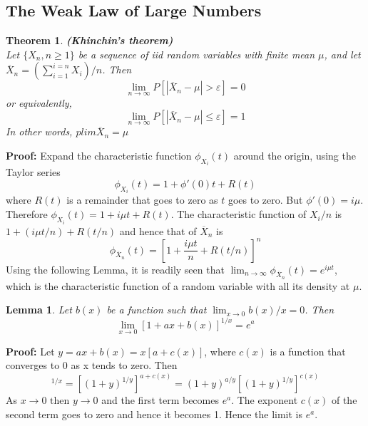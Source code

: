 \documentclass{article}
\newtheorem{theorem}{Theorem}[section]
\newtheorem{lemma}{Lemma}[section]
\begin{document}
\subsection{The Weak Law of Large Numbers}

\begin{theorem}
    \textbf{(Khinchin's theorem)}\\
    Let \(\{X_n, n\geq 1\}\) be a sequence of iid random variables with finite mean \(\mu\), and let \(\overline{X}_n=(\sum_{i=1}^{i=n}X_i)/n\). Then
    \begin{equation*}
        \lim_{n\rightarrow \infty} P[|\overline{X}_n-\mu|>\varepsilon]=0
    \end{equation*}
    or equivalently,
    \begin{equation*}
        \lim_{n\rightarrow \infty} P[|\overline{X}_n-\mu|\leq\varepsilon]=1
    \end{equation*}
    In other words, \(plim \overline{X}_n=\mu\)
\end{theorem}

\textbf{Proof:} Expand the characteristic function \(\phi_{X_i}(t)\) around the origin, using the Taylor series
\begin{equation*}
\phi_{X_i}(t)=1+\phi'(0)t+R(t)
\end{equation*}
where \(R(t)\) is a remainder that goes to zero as $t$ goes to zero. But \(\phi'(0)=i\mu\). Therefore \(\phi_{X_i}(t)=1+i\mu t+R(t)\). The characteristic function of \(X_i/n\) is \(1+(i\mu t/n)+R(t/n)\) and hence that of \(\overline{X}_n\) is
\begin{equation*}
    \phi_{\overline{X}_n}(t)=\left[1+\frac{i\mu t}{n} + R(t/n)\right]^n
\end{equation*}
Using the following Lemma, it is readily seen that \(\lim_{n \rightarrow \infty} \phi_{\overline{X}_n}(t)=e^{i\mu t}\), which is the characteristic function of a random variable with all its density at \(\mu\).

\begin{lemma}
    Let \(b(x)\) be a function such that \(\lim_{x \rightarrow 0} b(x)/x=0\). Then
    \begin{equation*}
        \lim_{x \rightarrow 0} [1+ax+b(x)]^{1/x} = e^a
    \end{equation*}
\end{lemma}

\textbf{Proof:} Let \(y=ax+b(x)=x[a+c(x)]\), where \(c(x)\) is a function that converges to \(0\) as x tends to zero. Then
\begin{equation*}
    [1+ax+b(x)]^{1/x}=[(1+y)^{1/y}]^{a+c(x)}=(1+y)^{a/y}[(1+y)^{1/y}]^{c(x)}
\end{equation*}
As \(x \rightarrow 0 \text{ then } y \rightarrow 0\) and the first term becomes \(e^a\). The exponent \(c(x)\) of the second term goes to zero and hence it becomes 1. Hence the limit is \(e^a\).
\end{document}
